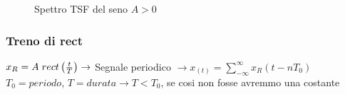 \begin{figure}[H]
{
                        }
                    \caption{Spettro TSF del seno $A>0$}
                \end{figure}
            \subsubsection{Treno di rect}
                $x_R=A\hspace{0.1cm}rect\left(\frac{t}{T}\right)\rightarrow$ Segnale periodico $\rightarrow x_{(t)} = \sum_{-\infty}^{\infty} x_R (t-nT_0)$\\
                $T_0 = periodo$, $T = durata \rightarrow T < T_0$, se cosi non fosse avremmo una costante
